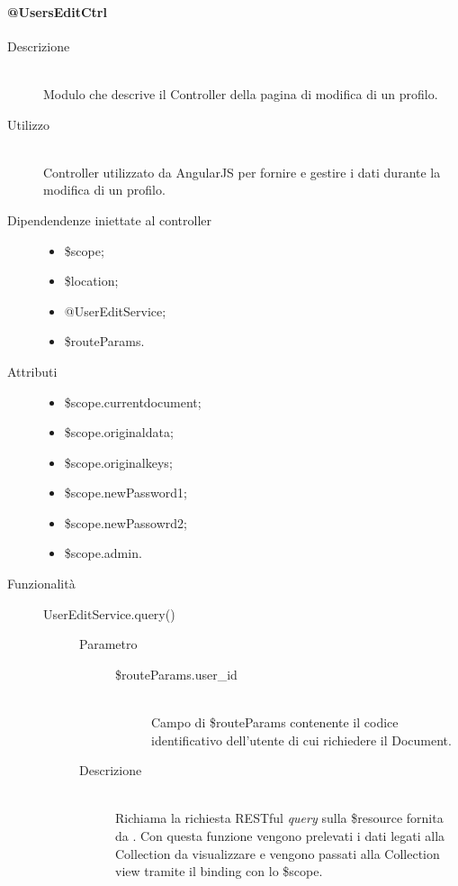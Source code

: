 \paragraph{@UsersEditCtrl}
\begin{description}
 \item[Descrizione] \hfill \\
 Modulo che descrive il Controller della pagina di modifica di un profilo.
 
 \item[Utilizzo] \hfill \\
 Controller utilizzato da AngularJS per fornire e gestire i dati durante la modifica di un profilo.
 
 \item[Dipendendenze iniettate al controller] \hfill
 \begin{itemize}
  \item \$scope;
  \item \$location;
  \item @UserEditService;
  \item \$routeParams.
  
 \end{itemize}
 
 \item[Attributi] \hfill
 \begin{itemize}
    \item \$scope.current\textunderscore document;
    \item \$scope.original\textunderscore data;
    \item \$scope.original\textunderscore keys;
    \item \$scope.newPassword1;
    \item \$scope.newPassowrd2;
    \item \$scope.admin.
 \end{itemize}
 
 \item[Funzionalità] \hfill
 \begin{description}
  \item[UserEditService.query()] \hfill
  \begin{description}
  	\item[Parametro] \hfill 
  		\begin{description}
  			\item[\$routeParams.user\_id] \hfill \\
  			Campo di \$routeParams contenente il codice identificativo dell'utente di cui richiedere il Document.
       \end{description}
  	\item[Descrizione] \hfill \\
    Richiama la richiesta RESTful \textit{query} sulla \$resource fornita da .
  Con questa funzione vengono prelevati i dati legati alla Collection da visualizzare e vengono
  passati alla Collection view tramite il binding con lo \$scope. 
  

\end{description}
\end{description}
\end{description}
